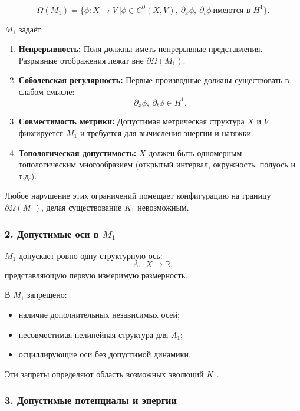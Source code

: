 \[
\Omega(M_1)
=
\Big\{
\phi : X \to V \ \big|
\phi \in C^{0}(X,V),\
\partial_x \phi,\ \partial_t \phi\ \text{имеются в } H^1
\Big\}.
\]

$M_1$ задаёт:

\begin{enumerate}
    \item \textbf{Непрерывность:}
    Поля должны иметь непрерывные представления. Разрывные отображения
    лежат вне $\partial\Omega(M_1)$.

    \item \textbf{Соболевская регулярность:}
    Первые производные должны существовать в слабом смысле:
    \[
    \partial_x \phi,\ \partial_t \phi \in H^1.
    \]

    \item \textbf{Совместимость метрики:}
    Допустимая метрическая структура $X$ и $V$ фиксируется $M_1$ и требуется
    для вычисления энергии и натяжки.

    \item \textbf{Топологическая допустимость:}
    $X$ должен быть одномерным топологическим многообразием
    (открытый интервал, окружность, полуось и т.д.).
\end{enumerate}

Любое нарушение этих ограничений помещает конфигурацию на границу
$\partial\Omega(M_1)$, делая существование $K_1$ невозможным.

\subsubsection*{2. Допустимые оси в \texorpdfstring{$M_1$}{M_1}}

$M_1$ допускает ровно одну структурную ось:
\[
A_1 : X \to \mathbb{R},
\]
представляющую первую измеримую размерность.

В $M_1$ запрещено:

\begin{itemize}
    \item наличие дополнительных независимых осей;
    \item несовместимая нелинейная структура для $A_1$;
    \item осциллирующие оси без допустимой динамики.
\end{itemize}

Эти запреты определяют область возможных эволюций $K_1$.

\subsubsection*{3. Допустимые потенциалы и энергии}

